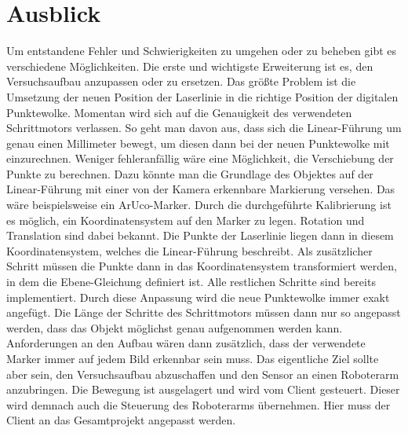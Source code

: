 \section{Ausblick}\label{ausblick}
	Um entstandene Fehler und Schwierigkeiten zu umgehen oder zu beheben gibt es verschiedene Möglichkeiten. Die erste und wichtigste Erweiterung ist es, den Versuchsaufbau anzupassen oder zu ersetzen. Das größte Problem ist die Umsetzung der neuen Position der Laserlinie in die richtige Position der digitalen Punktewolke. Momentan wird sich auf die Genauigkeit des verwendeten Schrittmotors verlassen. So geht man davon aus, dass sich die Linear-Führung um genau einen Millimeter bewegt, um diesen dann bei der neuen Punktewolke mit einzurechnen. Weniger fehleranfällig wäre eine Möglichkeit, die Verschiebung der Punkte zu berechnen. Dazu könnte man die Grundlage des Objektes auf der Linear-Führung mit einer von der Kamera erkennbare Markierung versehen. Das wäre beispielsweise ein ArUco-Marker. Durch die durchgeführte Kalibrierung ist es möglich, ein Koordinatensystem auf den Marker zu legen. Rotation und Translation sind dabei bekannt. Die Punkte der Laserlinie liegen dann in diesem Koordinatensystem, welches die Linear-Führung beschreibt. Als zusätzlicher Schritt müssen die Punkte dann in das Koordinatensystem transformiert werden, in dem die Ebene-Gleichung definiert ist. Alle restlichen Schritte sind bereits implementiert. Durch diese Anpassung wird die neue Punktewolke immer exakt angefügt. Die Länge der Schritte des Schrittmotors müssen dann nur so angepasst werden, dass das Objekt möglichst genau aufgenommen werden kann. Anforderungen an den Aufbau wären dann zusätzlich, dass der verwendete Marker immer auf jedem Bild erkennbar sein muss. \newline
	Das eigentliche Ziel sollte aber sein, den Versuchsaufbau abzuschaffen und den Sensor an einen Roboterarm anzubringen. Die Bewegung ist ausgelagert und wird vom Client gesteuert. Dieser wird demnach auch die Steuerung des Roboterarms übernehmen. Hier muss der Client an das Gesamtprojekt angepasst werden. \newline
